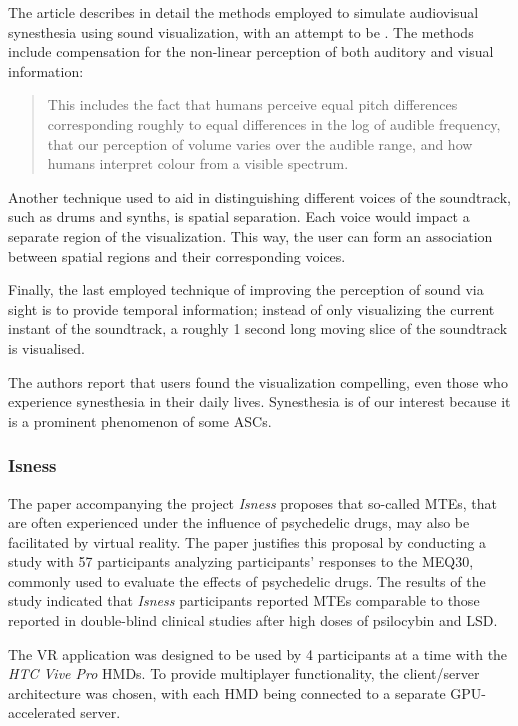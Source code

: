 The article describes in detail the methods employed to simulate audiovisual synesthesia using sound visualization, with an attempt to be . The methods include compensation for the non-linear perception of both auditory and visual information:

\begin{quote}
    This includes the fact that humans perceive equal pitch differences corresponding roughly to equal differences in the log of audible frequency, that our perception of volume varies over the audible range, and how humans interpret colour from a visible spectrum.
\end{quote}

Another technique used to aid in distinguishing different voices of the soundtrack, such as drums and synths, is spatial separation. Each voice would impact a separate region of the visualization. This way, the user can form an association between spatial regions and their corresponding voices.

Finally, the last employed technique of improving the perception of sound via sight is to provide temporal information; instead of only visualizing the current instant of the soundtrack, a roughly 1 second long moving slice of the soundtrack is visualised.

The authors report that users found the visualization compelling, even those who experience synesthesia in their daily lives. Synesthesia is of our interest because it is a prominent phenomenon of some \acp{ASC}.

\subsubsection{Isness}
The paper \autocite{glowacki2020isness} accompanying the project \textit{Isness} proposes that so-called \acp{MTE}, that are often experienced under the influence of psychedelic drugs, may also be facilitated by virtual reality. The paper justifies this proposal by conducting a study with 57 participants analyzing participants' responses to the \ac{MEQ30}, commonly used to evaluate the effects of psychedelic drugs. The results of the study indicated that \textit{Isness} participants reported \acp{MTE} comparable to those reported in double-blind clinical studies after high doses of psilocybin and LSD.

The \ac{VR} application was designed to be used by 4 participants at a time with the \textit{HTC Vive Pro} \acp{HMD}. To provide multiplayer functionality, the client/server architecture was chosen, with each \ac{HMD} being connected to a separate \acs{GPU}-accelerated server.

